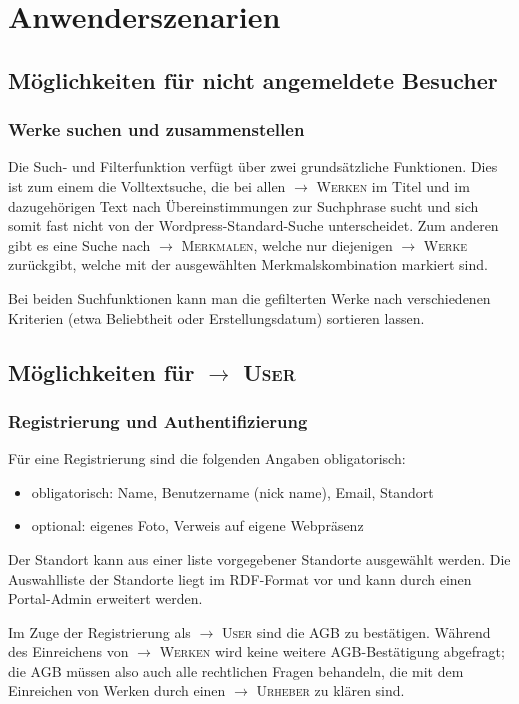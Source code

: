 \documentclass[a4paper,11pt]{article}
\newcommand{\glossar}[1]{{$\to$ \textsc{#1}}}
\begin{document}
\section{Anwenderszenarien}

\subsection{Möglichkeiten für nicht angemeldete Besucher} 

\subsubsection{Werke suchen und zusammenstellen}

Die Such- und Filterfunktion verfügt über zwei grundsätzliche Funktionen. Dies
ist zum einem die Volltextsuche, die bei allen \glossar{Werken} im Titel und im
dazugehörigen Text nach Übereinstimmungen zur Suchphrase sucht und sich somit
fast nicht von der Wordpress-Standard-Suche unterscheidet. Zum anderen gibt es
eine Suche nach \glossar{Merkmalen}, welche nur diejenigen \glossar{Werke}
zurückgibt, welche mit der ausgewählten Merkmalskombination markiert sind.

Bei beiden Suchfunktionen kann man die gefilterten Werke nach verschiedenen
Kriterien (etwa Beliebtheit oder Erstellungsdatum) sortieren lassen.

\subsection{Möglichkeiten für \glossar{User}}

\subsubsection{Registrierung und Authentifizierung}

Für eine Registrierung sind die folgenden Angaben obligatorisch:
\begin{itemize}
\item obligatorisch: Name, Benutzername (nick name), Email, Standort 
\item optional: eigenes Foto, Verweis auf eigene Webpräsenz 
\end{itemize}
Der Standort kann aus einer liste vorgegebener Standorte ausgewählt
werden. Die Auswahlliste der Standorte liegt im RDF-Format vor und kann durch
einen Portal-Admin erweitert werden. 

Im Zuge der Registrierung als \glossar{User} sind die AGB zu bestätigen.
Während des Einreichens von \glossar{Werken} wird keine weitere AGB-Bestätigung
abgefragt; die AGB müssen also auch alle rechtlichen Fragen behandeln, die mit
dem Einreichen von Werken durch einen \glossar{Urheber} zu klären sind.
\end{document}
